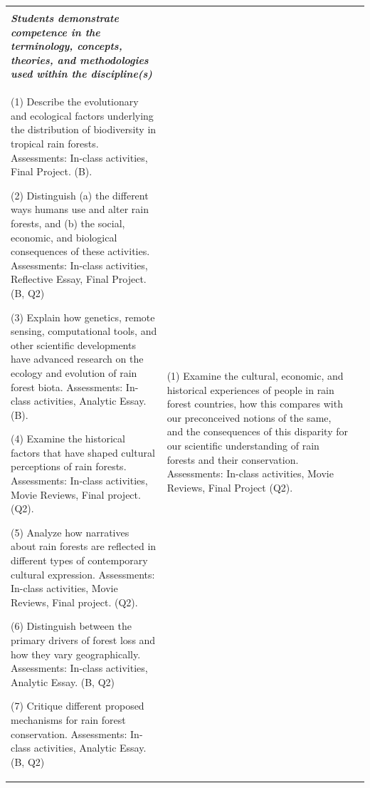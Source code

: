 \documentclass[
  10pt,
  letterpaper,
  oneside,
  open=any]{scrbook}
\begin{document}
\begin{tabular}[t]{>{\raggedright\arraybackslash}p{25em}>{\raggedright\arraybackslash}p{25em}l}
\toprule
\cellcolor[HTML]{1F691B}{\textcolor{white}{\textbf{CONTENT}}} & \cellcolor[HTML]{1F691B}{\textcolor{white}{\textbf{CONNECTION}}} & \cellcolor[HTML]{1F691B}{\textcolor{white}{\textbf{}}}\\
\em{\textbf{Students demonstrate competence in the terminology, concepts, theories, and methodologies used within the discipline(s)}} & \em{\textbf{\cellcolor{white}{\textcolor{black}{Students connect course content with meaningful critical reflection on their intellectual, personal, and professional development at UF and beyond.}}}} & \em{\textbf{}}\\
(1) Describe the evolutionary and ecological factors underlying the distribution of biodiversity in tropical rain forests. Assessments: In-class activities, Final Project. (B). 

(2)  Distinguish (a) the different ways humans use and alter rain forests, and (b) the social, economic, and biological consequences of these activities. Assessments: In-class activities, Reflective Essay, Final Project. (B, Q2)  

(3)  Explain how genetics, remote sensing, computational tools, and other scientific developments have advanced research on the ecology and evolution of rain forest biota. Assessments: In-class activities, Analytic Essay. (B). 

(4)  Examine the historical factors that have shaped cultural perceptions of rain forests. Assessments: In-class activities, Movie Reviews, Final project. (Q2).  

(5)  Analyze how narratives about rain forests are reflected in different types of contemporary cultural expression. Assessments: In-class activities, Movie Reviews, Final project. (Q2).  

(6)  Distinguish between the primary drivers of forest loss and how they vary geographically. Assessments: In-class activities, Analytic Essay. (B, Q2)  

(7)  Critique different proposed mechanisms for rain forest conservation. Assessments: In-class activities, Analytic Essay. (B, Q2) & (1) Examine the cultural, economic, and historical experiences of people in rain forest countries, how this compares with our preconceived notions of the same, and the consequences of this disparity for our scientific understanding of rain forests and their conservation. Assessments: In-class activities, Movie Reviews, Final Project  (Q2). 


\end{tabular}
\end{document}
